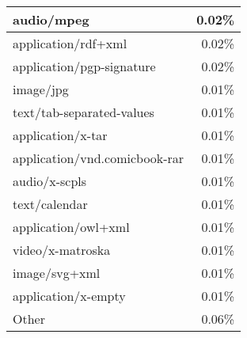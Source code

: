 \begin{center}
\begin{tabular*}{\textwidth}{l@{\extracolsep{\fill}}r}
	\hline
	audio/mpeg			&	0.02\% \\
	\hline
	application/rdf+xml	&	0.02\% \\
	\hline
	application/pgp-signature		&	0.02\% \\
	\hline
	image/jpg			&	0.01\% \\
	\hline
	text/tab-separated-values		&	0.01\% \\
	\hline
	application/x-tar	&	0.01\% \\
	\hline
	application/vnd.comicbook-rar	&	0.01\% \\
	\hline
	audio/x-scpls		&	0.01\% \\
	\hline
	text/calendar		&	0.01\% \\
	\hline
	application/owl+xml	&	0.01\% \\
	\hline
	video/x-matroska	&	0.01\% \\
	\hline
	image/svg+xml		&	0.01\% \\
	\hline
	application/x-empty	&	0.01\% \\
	\hline
	Other				&	0.06\% \\
	\hline
\end{tabular*}
\end{center}
\fi

